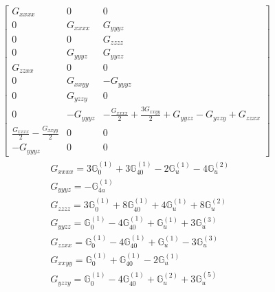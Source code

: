\documentclass[fleqn,8pt,landscape]{jsarticle}
\begin{document}
\begin{align*}
\begin{bmatrix} G_{xxxx} & 0 & 0 \\ 0 & G_{xxxx} & G_{yyyz} \\ 0 & 0 & G_{zzzz} \\ 0 & G_{yyyz} & G_{yyzz} \\ G_{zzxx} & 0 & 0 \\ 0 & G_{xxyy} & - G_{yyyz} \\ 0 & G_{yzzy} & 0 \\ 0 & - G_{yyyz} & - \frac{G_{xxxx}}{2} + \frac{3 G_{xxyy}}{2} + G_{yyzz} - G_{yzzy} + G_{zzxx} \\ \frac{G_{xxxx}}{2} - \frac{G_{xxyy}}{2} & 0 & 0 \\ - G_{yyyz} & 0 & 0 \end{bmatrix}
\end{align*}
\begin{align*}
& G_{xxxx} = 3 \mathbb{G}_{0}^{(1)} + 3 \mathbb{G}_{40}^{(1)} - 2 \mathbb{G}_{u}^{(1)} - 4 \mathbb{G}_{u}^{(2)} \\
& G_{yyyz} = - \mathbb{G}_{4a}^{(1)} \\
& G_{zzzz} = 3 \mathbb{G}_{0}^{(1)} + 8 \mathbb{G}_{40}^{(1)} + 4 \mathbb{G}_{u}^{(1)} + 8 \mathbb{G}_{u}^{(2)} \\
& G_{yyzz} = \mathbb{G}_{0}^{(1)} - 4 \mathbb{G}_{40}^{(1)} + \mathbb{G}_{u}^{(1)} + 3 \mathbb{G}_{u}^{(3)} \\
& G_{zzxx} = \mathbb{G}_{0}^{(1)} - 4 \mathbb{G}_{40}^{(1)} + \mathbb{G}_{u}^{(1)} - 3 \mathbb{G}_{u}^{(3)} \\
& G_{xxyy} = \mathbb{G}_{0}^{(1)} + \mathbb{G}_{40}^{(1)} - 2 \mathbb{G}_{u}^{(1)} \\
& G_{yzzy} = \mathbb{G}_{0}^{(1)} - 4 \mathbb{G}_{40}^{(1)} + \mathbb{G}_{u}^{(2)} + 3 \mathbb{G}_{u}^{(5)}
\end{align*}
\end{document}
